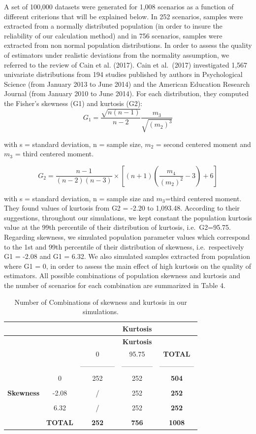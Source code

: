 \documentclass[
  man,floatsintext]{apa6}
\begin{document}
A set of 100,000 datasets were generated for 1,008 scenarios as a function of different criterions that will be explained below. In 252 scenarios, samples were extracted from a normally distributed population (in order to insure the reliability of our calculation method) and in 756 scenarios, samples were extracted from non normal population distributions. In order to assess the quality of estimators under realistic deviations from the normality assumption, we referred to the review of Cain et al. (2017). Cain et al.~(2017) investigated 1,567 univariate distributions from 194 studies published by authors in Psychological Science (from January 2013 to June 2014) and the American Education Research Journal (from January 2010 to June 2014). For each distribution, they computed the Fisher's skewness (G1) and kurtosis (G2):
\begin{equation} 
G_{1}=\frac{\sqrt{n(n-1)}}{n-2} \frac{m_{3}}{\sqrt{(m_{2})^3}}
\label{eq:skew}
\end{equation}

with s = standard deviation, n = sample size, \(m_{2}\) = second centered moment and \(m_{3}\) = third centered moment.

\begin{equation} 
G_{2}=\frac{n-1}{(n-2)(n-3)}\times [(n+1)(\frac{m_{4}}{(m_{2})^2}-3)+6]
\label{eq:kurt}
\end{equation}

with s = standard deviation, n = sample size and \(m_{3}\)=third centered moment. They found values of kurtosis from G2 = -2.20 to 1,093.48. According to their suggestions, throughout our simulations, we kept constant the population kurtosis value at the 99th percentile of their distribution of kurtosis, i.e.~G2=95.75. Regarding skewness, we simulated population parameter values which correspond to the 1st and 99th percentile of their distribution of skewness, i.e.~respectively G1 = -2.08 and G1 = 6.32. We also simulated samples extracted from population where G1 = 0, in order to assess the main effect of high kurtosis on the quality of estimators. All possible combinations of population skewness and kurtosis and the number of scenarios for each combination are summarized in Table 4.

\newpage

\begin{longtable}[]{@{}ccccc@{}}
\caption{Number of Combinations of skewness and kurtosis in our simulations.}\tabularnewline
\toprule
& & & \textbf{Kurtosis} &\tabularnewline
\midrule
\endfirsthead
\toprule
& & & \textbf{Kurtosis} &\tabularnewline
\midrule
\endhead
& & 0 & 95.75 & \textbf{TOTAL}\tabularnewline
& & --------------- & -------------- & ---------------\tabularnewline
& 0 & 252 & 252 & \textbf{504}\tabularnewline
& & & &\tabularnewline
\textbf{Skewness} & -2.08 & / & 252 & \textbf{252}\tabularnewline
& & & &\tabularnewline
& 6.32 & / & 252 & \textbf{252}\tabularnewline
& & & &\tabularnewline
& \textbf{TOTAL} & \textbf{252} & \textbf{756} & \textbf{1008}\tabularnewline
\bottomrule
\end{longtable}
\end{document}
